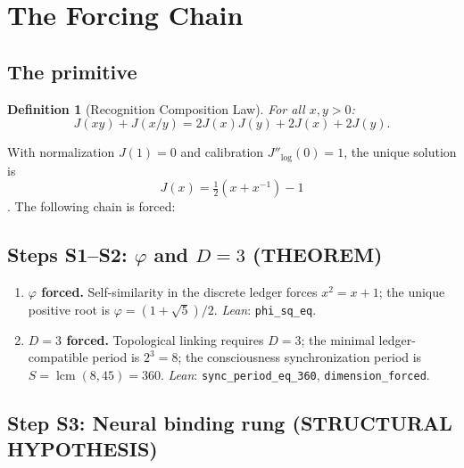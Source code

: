 \documentclass[11pt,a4paper]{article}
\newtheorem{definition}[theorem]{Definition}
\begin{document}
\section{The Forcing Chain}
\label{sec:forcing}

\subsection{The primitive}

\begin{definition}[Recognition Composition Law]
\label{def:rcl}
For all $x,y > 0$:
\begin{equation}
  \label{eq:rcl}
  J(xy) + J(x/y) = 2J(x)J(y) + 2J(x) + 2J(y).
\end{equation}
\end{definition}

\noindent
With normalization $J(1)=0$ and calibration $J''_{\log}(0)=1$, the
unique solution is
\begin{equation}
  \label{eq:jcost}
  J(x) = \tfrac{1}{2}(x + x^{-1}) - 1
\end{equation}
\citep{washburn2025axioms}. The following chain is forced:

\subsection{Steps S1--S2: $\varphi$ and $D=3$ (THEOREM)}

\begin{enumerate}[label=\textbf{S\arabic*.}]
  \item \textbf{$\varphi$ forced.}
    Self-similarity in the discrete ledger forces $x^2 = x+1$;
    the unique positive root is $\varphi=(1+\sqrt{5})/2$.
    \emph{Lean}: \texttt{phi\_sq\_eq}.

  \item \textbf{$D=3$ forced.}
    Topological linking requires $D=3$; the minimal ledger-compatible
    period is $2^3=8$; the consciousness synchronization period is
    $S = \operatorname{lcm}(8,45) = 360$.
    \emph{Lean}: \texttt{sync\_period\_eq\_360}, \texttt{dimension\_forced}.
\end{enumerate}

\subsection{Step S3: Neural binding rung (STRUCTURAL HYPOTHESIS)}
\end{document}
